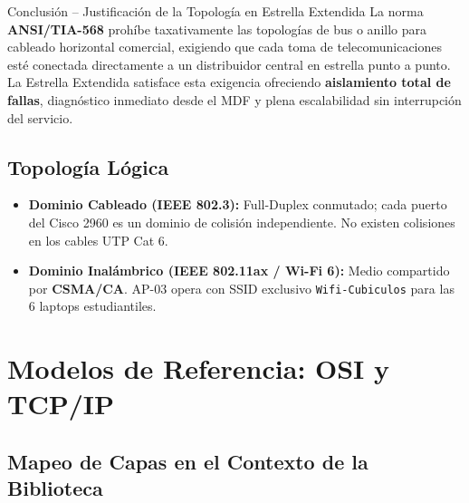 \documentclass[12pt,a4paper]{article}
\begin{document}
\begin{cajanorma}{Conclusión -- Justificación de la Topología en Estrella Extendida}
La norma \textbf{ANSI/TIA-568} prohíbe taxativamente las topologías de bus o anillo para cableado horizontal comercial, exigiendo que cada toma de telecomunicaciones esté conectada directamente a un distribuidor central en estrella punto a punto. La Estrella Extendida satisface esta exigencia ofreciendo \textbf{aislamiento total de fallas}, diagnóstico inmediato desde el MDF y plena escalabilidad sin interrupción del servicio.
\end{cajanorma}

\subsection{Topología Lógica}
\begin{itemize}[leftmargin=1.5em,itemsep=3pt]
  \item \textbf{Dominio Cableado (IEEE 802.3):} Full-Duplex conmutado; cada puerto del Cisco 2960 es un dominio de colisión independiente. No existen colisiones en los cables UTP Cat 6.
  \item \textbf{Dominio Inalámbrico (IEEE 802.11ax / Wi-Fi 6):} Medio compartido por \textbf{CSMA/CA}. AP-03 opera con SSID exclusivo \texttt{Wifi-Cubiculos} para las 6 laptops estudiantiles.
\end{itemize}

\section{Modelos de Referencia: OSI y TCP/IP}

\subsection{Mapeo de Capas en el Contexto de la Biblioteca}
\end{document}
